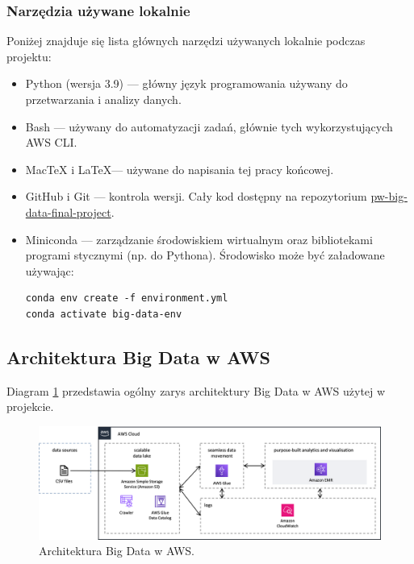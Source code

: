 \documentclass[12pt, a4paper]{article}
\begin{document}
\subsubsection{Narzędzia używane lokalnie}
Poniżej znajduje się lista głównych narzędzi używanych lokalnie podczas projektu:
\begin{itemize}
    \item Python (wersja 3.9) --- główny język programowania używany do przetwarzania i analizy danych.
    \item Bash --- używany do automatyzacji zadań, głównie tych wykorzystujących AWS CLI.
    \item MacTeX i \LaTeX --- używane do napisania tej pracy końcowej.
    \item GitHub i Git --- kontrola wersji. Cały kod dostępny na repozytorium \href{https://github.com/safurynp/pw-big-data-final-project}{pw-big-data-final-project}.
    \item Miniconda --- zarządzanie środowiskiem wirtualnym oraz bibliotekami programi stycznymi (np. do Pythona). Środowisko może być załadowane używając:
\begin{verbatim}
conda env create -f environment.yml
conda activate big-data-env
\end{verbatim}

\end{itemize}

\subsection{Architektura Big Data w AWS} \label{sec:aws_architecture}
Diagram \ref{fig:aws_architecture} przedstawia ogólny zarys architektury Big Data w AWS użytej w projekcie.
\begin{figure}[h!]
    \includegraphics[width=\textwidth]{figures/aws_architecture.png}
    \caption{Architektura Big Data w AWS.}
    \label{fig:aws_architecture}
\end{figure}
\end{document}
